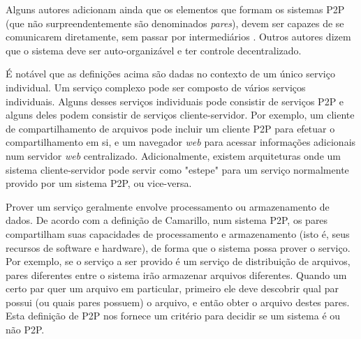 \documentclass[a4paper]{article}
\begin{document}
Alguns autores adicionam ainda que os elementos que formam os sistemas P2P (que não surpreendentemente são denominados \textit{pares}), devem ser capazes de se comunicarem diretamente, sem passar por intermediários \cite{schollmeier2001}. Outros autores dizem que o sistema deve ser auto-organizável e ter controle decentralizado\cite{roussopoulos2004}.

É notável que as definições acima são dadas no contexto de um único serviço individual. Um serviço complexo pode ser composto de vários serviços individuais. Alguns desses serviços individuais pode consistir de serviços P2P e alguns deles podem consistir de serviços cliente-servidor. Por exemplo, um cliente de compartilhamento de arquivos pode incluir um cliente P2P para efetuar o compartilhamento em si, e um navegador \textit{web} para acessar informações adicionais num servidor \textit{web} centralizado. Adicionalmente, existem arquiteturas onde um sistema cliente-servidor pode servir como "estepe" para um serviço normalmente provido por um sistema P2P, ou vice-versa. \cite{camarillop2parch}

Prover um serviço geralmente envolve processamento ou armazenamento de dados. De acordo com a definição de Camarillo, num sistema P2P, os pares compartilham suas capacidades de processamento e armazenamento (isto é, seus recursos de software e hardware), de forma que o sistema possa prover o serviço. Por exemplo, se o serviço a ser provido é um serviço de distribuição de arquivos, pares diferentes entre o sistema irão armazenar arquivos diferentes. Quando um certo par quer um arquivo em particular, primeiro ele deve descobrir qual par possui (ou quais pares possuem) o arquivo, e então obter o arquivo destes pares\cite{camarillop2parch}. Esta definição de P2P nos fornece um critério para decidir se um sistema é ou não P2P.
\end{document}

